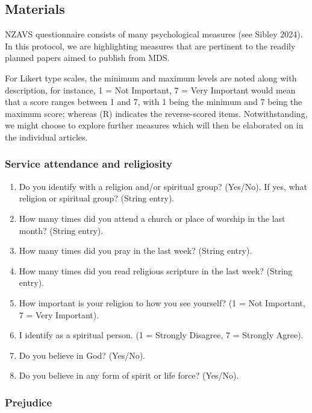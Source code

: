 \documentclass[
]{interact}
\providecommand{\tightlist}{%
  \setlength{\itemsep}{0pt}\setlength{\parskip}{0pt}}\usepackage{longtable,booktabs,array}
\begin{document}
\subsection{Materials}\label{materials}

NZAVS questionnaire consists of many psychological measures (see Sibley
2024). In this protocol, we are highlighting measures that are pertinent
to the readily planned papers aimed to publish from MDS.

For Likert type scales, the minimum and maximum levels are noted along
with description, for instance, 1 = Not Important, 7 = Very Important
would mean that a score ranges between 1 and 7, with 1 being the minimum
and 7 being the maximum score; whereas (R) indicates the reverse-scored
items. Notwithstanding, we might choose to explore further measures
which will then be elaborated on in the individual articles.

\subsubsection{Service attendance and
religiosity}\label{service-attendance-and-religiosity}

\begin{enumerate}
\def\labelenumi{\arabic{enumi}.}
\tightlist
\item
  Do you identify with a religion and/or spiritual group? (Yes/No). If
  yes, what religion or spiritual group? (String entry).
\item
  How many times did you attend a church or place of worship in the last
  month? (String entry).
\item
  How many times did you pray in the last week? (String entry).
\item
  How many times did you read religious scripture in the last week?
  (String entry).
\item
  How important is your religion to how you see yourself? (1 = Not
  Important, 7 = Very Important).
\item
  I identify as a spiritual person. (1 = Strongly Disagree, 7 = Strongly
  Agree).
\item
  Do you believe in God? (Yes/No).
\item
  Do you believe in any form of spirit or life force? (Yes/No).
\end{enumerate}

\subsubsection{Prejudice}\label{prejudice}
\end{document}
